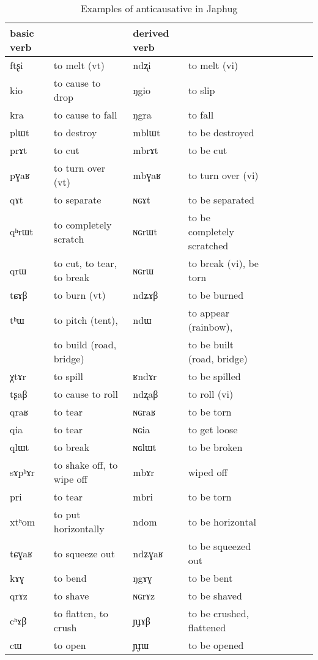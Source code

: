 \documentclass[oldfontcommands,oneside,a4paper,11pt]{memoir}
\newcommand{\ipa}[1]{{\phon #1}} %
\begin{document}
\begin{table}[H]
\caption{Examples of anticausative in Japhug}\label{tab:anticausative}
\begin{tabular}{lllllllll} \toprule
basic verb  & &derived  verb &\\
\midrule
\ipa{ftʂi}  &	to melt (vt)	&		\ipa{ndʐi}  &	to melt (vi)		\\
\ipa{kio}  &	to cause to drop	&		\ipa{ŋgio}  &	to slip		\\
\ipa{kra}  &		to cause to fall&		\ipa{ŋgra}  &	to fall		\\
\ipa{plɯt}  &	to destroy	&		\ipa{mblɯt}  &	to be destroyed		\\
\ipa{prɤt}  &	to cut	&		\ipa{mbrɤt}  &		to be cut	\\
\ipa{pɣaʁ}  &	to turn over (vt)	&		\ipa{mbɣaʁ}  &		to turn over (vi)	\\
\ipa{qɤt}  &	to separate	&		\ipa{ɴɢɤt}  &	to be separated		\\
\ipa{qʰrɯt}  &	to completely scratch	&		\ipa{ɴɢrɯt}  &	to be completely scratched		\\
\ipa{qrɯ}  &	to cut, to tear, to break	&		\ipa{ɴɢrɯ}  &	to break (vi), be torn		\\
\ipa{tɕɤβ}  &	to burn (vt)	&		\ipa{ndʑɤβ}  &	to be burned		\\
\ipa{tʰɯ}  &	to pitch (tent),  	&		\ipa{ndɯ}  &	to appear (rainbow), 	\\
 &	 to build (road, bridge)	&		   &	  to be built (road, bridge)		\\
\ipa{χtɤr}  &	 to spill	&		\ipa{ʁndɤr}  &		to be spilled	\\
\ipa{tʂaβ}  &	to cause to roll	&		\ipa{ndʐaβ}  &	to roll (vi)		\\
\ipa{qraʁ}  &	to tear	&		\ipa{ɴɢraʁ}  &		to be torn	\\
\ipa{qia}  &	to tear	&		\ipa{ɴɢia}  &		to get loose  	\\
\ipa{qlɯt}  &	to break	&		\ipa{ɴɢlɯt}  &		to be broken	\\
\ipa{sɤpʰɤr}  &	to shake off, to wipe off	&		\ipa{mbɤr}  &	wiped off	 	\\
 \ipa{pri}  &	 to tear	&		\ipa{mbri}  &	to be torn	 	\\
  \ipa{xtʰom}  &	 to put horizontally	&		\ipa{ndom}  &	 	to be horizontal 	\\
  \ipa{tɕɣaʁ}  &	 to squeeze out 	&		\ipa{ndʑɣaʁ}  &	 to be squeezed out	 	\\ 
   \ipa{kɤɣ}  &	 to bend 	&		\ipa{ŋgɤɣ}  &	 to be bent	 	\\ 
   \ipa{qrɤz}  &	 to shave 	&		\ipa{ɴɢrɤz}  &	 	to be shaved 	\\ 
   \ipa{cʰɤβ}  &	 to flatten, to crush 	&		\ipa{ɲɟɤβ}  &	to be crushed, flattened 	 	\\ 
   \ipa{cɯ}  &	 to open 	&		\ipa{ɲɟɯ}  &	 to be opened	 	\\ 
 \bottomrule
\end{tabular}
\end{table}
\end{document}
